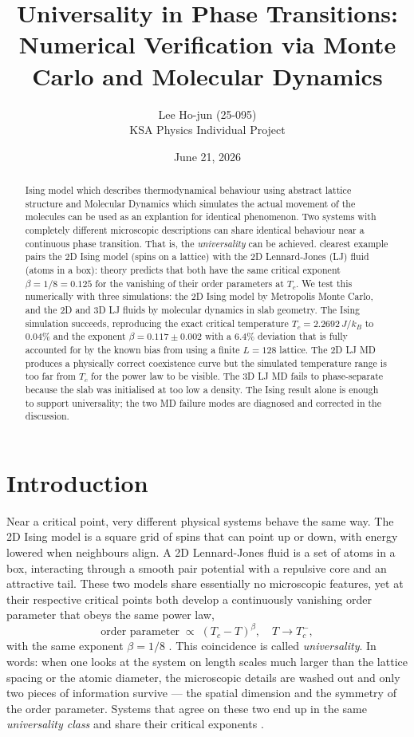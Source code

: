\documentclass[12pt,a4paper]{article}
\title{\textbf{Universality in Phase Transitions:\\
Numerical Verification via Monte Carlo and Molecular Dynamics}}
\author{Lee Ho-jun (25-095)\\
KSA Physics Individual Project}
\date{June 21, 2026}
\begin{document}
\maketitle

\begin{abstract}

Ising model which describes thermodynamical behaviour using abstract lattice structure and Molecular Dynamics which simulates the actual movement of the molecules can be used as an explantion for identical phenomenon.
Two systems with completely different microscopic descriptions can share identical
behaviour near a continuous phase transition. That is, the \emph{universality} can be achieved.
clearest example pairs the 2D Ising model (spins on a lattice) with the 2D Lennard-Jones
(LJ) fluid (atoms in a box): theory predicts that both have the same critical exponent
$\beta = 1/8 = 0.125$ for the vanishing of their order parameters at $T_c$. We test this
numerically with three simulations: the 2D Ising model by Metropolis Monte Carlo, and the
2D and 3D LJ fluids by molecular dynamics in slab geometry. The Ising simulation succeeds,
reproducing the exact critical temperature $T_c = 2.2692\,J/k_B$ to $0.04\%$ and the
exponent $\beta = 0.117 \pm 0.002$ with a $6.4\%$ deviation that is fully accounted for
by the known bias from using a finite $L = 128$ lattice. The 2D LJ MD produces a
physically correct coexistence curve but the simulated temperature range is too far from
$T_c$ for the power law to be visible. The 3D LJ MD fails to phase-separate because the
slab was initialised at too low a density. The Ising result alone is enough to support
universality; the two MD failure modes are diagnosed and corrected in the discussion.
\end{abstract}

\section{Introduction}

Near a critical point, very different physical systems behave the same way. The 2D Ising
model is a square grid of spins that can point up or down, with energy lowered when
neighbours align. A 2D Lennard-Jones fluid is a set of atoms in a box, interacting through
a smooth pair potential with a repulsive core and an attractive tail. These two models
share essentially no microscopic features, yet at their respective critical points both
develop a continuously vanishing order parameter that obeys the same power law,
\begin{equation}
  \text{order parameter} \;\propto\; (T_c - T)^{\beta}, \quad T \to T_c^-,
\end{equation}
with the same exponent $\beta = 1/8$ \cite{onsager}. This coincidence is called
\emph{universality}. In words: when one looks at the system on length scales much larger
than the lattice spacing or the atomic diameter, the microscopic details are washed out
and only two pieces of information survive — the spatial dimension and the symmetry of
the order parameter. Systems that agree on these two end up in the same
\emph{universality class} and share their critical exponents \cite{goldenfeld}.
\end{document}
